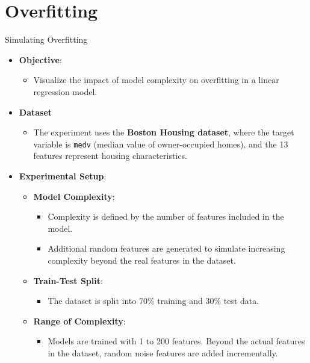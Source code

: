 \documentclass[
  ignorenonframetext,
]{beamer}
\providecommand{\tightlist}{%
  \setlength{\itemsep}{0pt}\setlength{\parskip}{0pt}}\usepackage{longtable,booktabs,array}
\begin{document}
\section{Overfitting}\label{overfitting}

\begin{frame}[fragile]{Simulating Overfitting}
\label{simulating-overfitting}
\begin{itemize}
\tightlist
\item
  \textbf{Objective}:

  \begin{itemize}
  \tightlist
  \item
    Visualize the impact of model complexity on overfitting in a linear
    regression model.
  \end{itemize}
\item
  \textbf{Dataset}

  \begin{itemize}
  \tightlist
  \item
    The experiment uses the \textbf{Boston Housing dataset}, where the
    target variable is \texttt{medv} (median value of owner-occupied
    homes), and the 13 features represent housing characteristics.
  \end{itemize}
\end{itemize}
\end{frame}

\begin{frame}
\begin{itemize}
\tightlist
\item
  \textbf{Experimental Setup}:

  \begin{itemize}
  \tightlist
  \item
    \textbf{Model Complexity}:

    \begin{itemize}
    \tightlist
    \item
      Complexity is defined by the number of features included in the
      model.
    \item
      Additional random features are generated to simulate increasing
      complexity beyond the real features in the dataset.
    \end{itemize}
  \item
    \textbf{Train-Test Split}:

    \begin{itemize}
    \tightlist
    \item
      The dataset is split into 70\% training and 30\% test data.
    \end{itemize}
  \item
    \textbf{Range of Complexity}:

    \begin{itemize}
    \tightlist
    \item
      Models are trained with 1 to 200 features. Beyond the actual
      features in the dataset, random noise features are added
      incrementally.
    \end{itemize}
  \end{itemize}
\end{itemize}
\end{frame}
\end{document}
